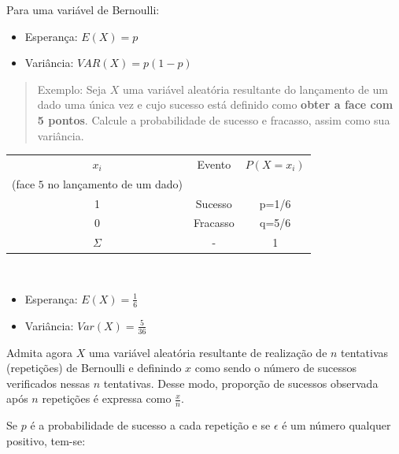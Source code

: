 \documentclass[
]{book}
\providecommand{\tightlist}{%
  \setlength{\itemsep}{0pt}\setlength{\parskip}{0pt}}
\begin{document}
\hfill\break

Para uma variável de Bernoulli:

\begin{itemize}
\tightlist
\item
  Esperança: \(E(X)=p\)\\
\item
  Variância: \(VAR(X)=p(1-p)\)
\end{itemize}

\hfill\break

\begin{quote}
Exemplo: Seja \(X\) uma variável aleatória resultante do lançamento de um dado uma única vez e cujo sucesso está definido como \textbf{obter a face com 5 pontos}. Calcule a probabilidade de sucesso e fracasso, assim como sua variância.
\end{quote}

\hfill\break

\begin{table}[h]
\centering
\begin{tabular}{|c|c|c|}
\hline 
$x_{i}$ & Evento & $P(X=x_{i})$ \\ 
(face $5$ no lançamento de um dado) &  &  \\ 
\hline 
1 & Sucesso & p=1/6 \\ 
\hline 
0 & Fracasso & q=5/6 \\ 
\hline 
$\Sigma$ & - & 1 \\ 
\hline 
\end{tabular} 
\end{table}

~

\begin{itemize}
\tightlist
\item
  Esperança: \(E(X)= \frac{1}{6}\)\\
\item
  Variância: \(Var(X)= \frac{5}{36}\)
\end{itemize}

\hfill\break

Admita agora \(X\) uma variável aleatória resultante de realização de \(n\) tentativas (repetições) de Bernoulli e definindo \(x\) como sendo o número de sucessos verificados nessas \(n\) tentativas. Desse modo, proporção de sucessos observada após \(n\) repetições é expressa como \(\frac{x}{n}\).

\hfill\break

Se \(p\) é a probabilidade de sucesso a cada repetição e se \(\epsilon\) é um número qualquer positivo, tem-se:
\end{document}
